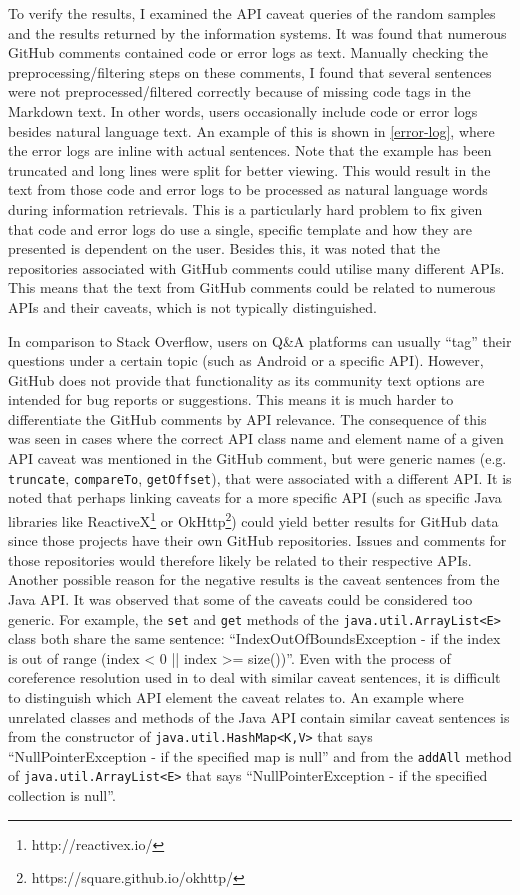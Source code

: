 To verify the results, I examined the API caveat queries of the random samples and the results returned by the information systems. It was found that numerous GitHub comments contained code or error logs as text. Manually checking the preprocessing/filtering steps on these comments, I found that several sentences were not preprocessed/filtered correctly because of missing code tags in the Markdown text. In other words, users occasionally include code or error logs besides natural language text. An example of this is shown in \ref{error-log}, where the error logs are inline with actual sentences. Note that the example has been truncated and long lines were split for better viewing. This would result in the text from those code and error logs to be processed as natural language words during information retrievals. This is a particularly hard problem to fix given that code and error logs do use a single, specific template and how they are presented is dependent on the user. Besides this, it was noted that the repositories associated with GitHub comments could utilise many different APIs. This means that the text from GitHub comments could be related to numerous APIs and their caveats, which is not typically distinguished. \bigbreak

In comparison to Stack Overflow, users on Q\&A platforms can usually ``tag'' their questions under a certain topic (such as Android or a specific API). However, GitHub does not provide that functionality as its community text options are intended for bug reports or suggestions. This means it is much harder to differentiate the GitHub comments by API relevance. The consequence of this was seen in cases where the correct API class name and element name of a given API caveat was mentioned in the GitHub comment, but were generic names (e.g. \lstinline{truncate}, \lstinline{compareTo}, \lstinline{getOffset}), that were associated with a different API. It is noted that perhaps linking caveats for a more specific API (such as specific Java libraries like ReactiveX\footnote{http://reactivex.io/} or OkHttp\footnote{https://square.github.io/okhttp/}) could yield better results for GitHub data since those projects have their own GitHub repositories. Issues and comments for those repositories would therefore likely be related to their respective APIs. Another possible reason for the negative results is the caveat sentences from the Java API. It was observed that some of the caveats could be considered too generic. For example, the \lstinline{set} and \lstinline{get} methods of the \lstinline{java.util.ArrayList<E>} class both share the same sentence: ``IndexOutOfBoundsException - if the index is out of range (index < 0 || index >= size())''. Even with the process of coreference resolution used in \cite{jiamou} to deal with similar caveat sentences, it is difficult to distinguish which API element the caveat relates to.
An example where unrelated classes and methods of the Java API contain similar caveat sentences is from the constructor of \lstinline{java.util.HashMap<K,V>} that says ``NullPointerException - if the specified map is null'' and from the \lstinline{addAll} method of \lstinline{java.util.ArrayList<E>} that says ``NullPointerException - if the specified collection is null''. \bigbreak

